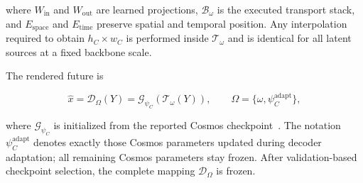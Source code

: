 where \(W_{\mathrm{in}}\) and \(W_{\mathrm{out}}\) are learned
projections, \(\mathcal B_\omega\) is the executed transport stack,
and \(E_{\mathrm{space}}\) and \(E_{\mathrm{time}}\) preserve spatial
and temporal position. Any interpolation required to obtain
\(h_C\times w_C\) is performed inside \(\mathcal T_\omega\) and is
identical for all latent sources at a fixed backbone scale.

The rendered future is

\begin{equation*}
\widehat x
=
\mathcal D_\Omega(Y)
=
\mathcal G_{\psi_C}
\left(
\mathcal T_\omega(Y)
\right),
\qquad
\Omega=\{\omega,\psi_C^{\mathrm{adapt}}\},
\end{equation*}

where \(\mathcal G_{\psi_C}\) is initialized from the reported
Cosmos checkpoint~\cite{nvidia2025cosmos}. The notation
\(\psi_C^{\mathrm{adapt}}\) denotes exactly those Cosmos parameters
updated during decoder adaptation; all remaining Cosmos parameters
stay frozen. After validation-based checkpoint selection, the complete
mapping \(\mathcal D_\Omega\) is frozen.


